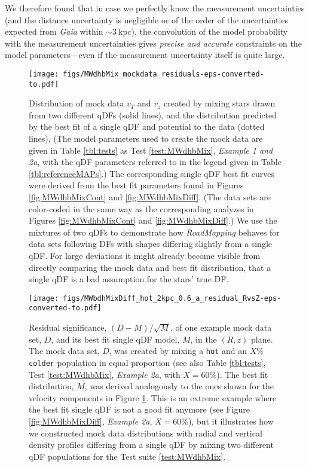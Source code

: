 \documentclass[iop,revtex4,numberedappendix,appendixfloats]{emulateapj}
\newcommand{\RM}{{\sl RoadMapping}}
\begin{document}
We therefore found that in case we perfectly know the measurement uncertainties (and the distance uncertainty is negligible or of the order of the uncertainties expected from \emph{Gaia} within $\sim3~\text{kpc}$), the convolution of the model probability with the measurement uncertainties gives \emph{precise and accurate} constraints on the model parameters---even if the measurement uncertainty itself is quite large.

\begin{figure}[!htbp]
\centering
\texttt{[image: figs/MWdhbMix\_mockdata\_residuals-eps-converted-to.pdf]}
\caption{Distribution of mock data $v_T$ and $v_z$ created by mixing stars drawn from two different qDFs (solid lines), and the distribution predicted by the best fit of a single qDF and potential to the data (dotted lines). (The model parameters used to create the mock data are given in Table \ref{tbl:tests} as Test \ref{test:MWdhbMix}, \emph{Example 1 and 2a}, with the qDF parameters referred to in the legend given in Table \ref{tbl:referenceMAPs}.) The corresponding single qDF best fit curves were derived from the best fit parameters found in Figures \ref{fig:MWdhbMixCont} and \ref{fig:MWdhbMixDiff}. (The data sets are color-coded in the same way as the corresponding analyzes in Figures \ref{fig:MWdhbMixCont} and \ref{fig:MWdhbMixDiff}.) We use the mixtures of two qDFs to demonstrate how \RM{} behaves for data sets following DFs with shapes differing slightly from a single qDF. For large deviations it might already become visible from directly comparing the mock data and best fit distribution, that a single qDF is a bad assumption for the stars' true DF.}
\label{fig:MWdhbMix_mockdata_residuals}
\end{figure}

\begin{figure}[!htbp]
\centering
\texttt{[image: figs/MWbdhMixDiff\_hot\_2kpc\_0.6\_a\_residual\_RvsZ-eps-converted-to.pdf]}
\caption{Residual significance, $(D-M)/\sqrt{M}$, of one example mock data set, $D$, and its best fit single qDF model, $M$, in the $(R,z)$ plane. The mock data set, $D$, was created by mixing a \texttt{hot} and an $X\%$ \texttt{colder} population in equal proportion (see also Table \ref{tbl:tests}, Test \ref{test:MWdhbMix}, \emph{Example 2a}, with $X=60\%$). The best fit distribution, $M$, was derived analogously to the ones shown for the velocity components in Figure \ref{fig:MWdhbMix_mockdata_residuals}. This is an extreme example where the best fit single qDF is not a good fit anymore (see Figure \ref{fig:MWdhbMixDiff}, \emph{Example 2a}, $X=60\%$), but it illustrates how we constructed mock data distributions with radial and vertical density profiles differing from a single qDF by mixing two different qDF populations for the Test suite \ref{test:MWdhbMix}.}
\label{fig:MWbdhMix_residual_RvsZ}
\end{figure}
\end{document}
